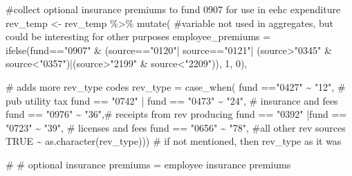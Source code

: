 \documentclass[
  letterpaper,
  DIV=11,
  numbers=noendperiod]{scrreport}
\newenvironment{Shaded}{\begin{snugshade}}{\end{snugshade}}
\newcommand{\AttributeTok}[1]{\textcolor[rgb]{0.40,0.45,0.13}{#1}}
\newcommand{\CommentTok}[1]{\textcolor[rgb]{0.37,0.37,0.37}{#1}}
\newcommand{\ConstantTok}[1]{\textcolor[rgb]{0.56,0.35,0.01}{#1}}
\newcommand{\DecValTok}[1]{\textcolor[rgb]{0.68,0.00,0.00}{#1}}
\newcommand{\FunctionTok}[1]{\textcolor[rgb]{0.28,0.35,0.67}{#1}}
\newcommand{\NormalTok}[1]{\textcolor[rgb]{0.00,0.23,0.31}{#1}}
\newcommand{\OtherTok}[1]{\textcolor[rgb]{0.00,0.23,0.31}{#1}}
\newcommand{\SpecialCharTok}[1]{\textcolor[rgb]{0.37,0.37,0.37}{#1}}
\newcommand{\StringTok}[1]{\textcolor[rgb]{0.13,0.47,0.30}{#1}}
\begin{document}
\begin{Shaded}
\begin{Highlighting}[]
\CommentTok{\#collect optional insurance premiums to fund 0907 for use in eehc expenditure  }
\NormalTok{rev\_temp }\OtherTok{\textless{}{-}}\NormalTok{ rev\_temp }\SpecialCharTok{\%\textgreater{}\%} 
  \FunctionTok{mutate}\NormalTok{(}
    \CommentTok{\#variable not used in aggregates, but could be interesting for other purposes}
    \AttributeTok{employee\_premiums =} \FunctionTok{ifelse}\NormalTok{(fund}\SpecialCharTok{==}\StringTok{"0907"} \SpecialCharTok{\&}\NormalTok{ (source}\SpecialCharTok{==}\StringTok{"0120"}\SpecialCharTok{|}\NormalTok{ source}\SpecialCharTok{==}\StringTok{"0121"}\SpecialCharTok{|}\NormalTok{ (source}\SpecialCharTok{\textgreater{}}\StringTok{"0345"} \SpecialCharTok{\&}\NormalTok{ source}\SpecialCharTok{\textless{}}\StringTok{"0357"}\NormalTok{)}\SpecialCharTok{|}\NormalTok{(source}\SpecialCharTok{\textgreater{}}\StringTok{"2199"} \SpecialCharTok{\&}\NormalTok{ source}\SpecialCharTok{\textless{}}\StringTok{"2209"}\NormalTok{)), }\DecValTok{1}\NormalTok{, }\DecValTok{0}\NormalTok{),}
    
    \CommentTok{\# adds more rev\_type codes}
    \AttributeTok{rev\_type =} \FunctionTok{case\_when}\NormalTok{(}
\NormalTok{      fund }\SpecialCharTok{==}\StringTok{"0427"} \SpecialCharTok{\textasciitilde{}} \StringTok{"12"}\NormalTok{, }\CommentTok{\# pub utility tax}
\NormalTok{      fund }\SpecialCharTok{==} \StringTok{"0742"} \SpecialCharTok{|}\NormalTok{ fund }\SpecialCharTok{==} \StringTok{"0473"} \SpecialCharTok{\textasciitilde{}} \StringTok{"24"}\NormalTok{, }\CommentTok{\# insurance and fees}
\NormalTok{      fund }\SpecialCharTok{==} \StringTok{"0976"} \SpecialCharTok{\textasciitilde{}} \StringTok{"36"}\NormalTok{,}\CommentTok{\# receipts from rev producing}
\NormalTok{      fund }\SpecialCharTok{==} \StringTok{"0392"} \SpecialCharTok{|}\NormalTok{fund }\SpecialCharTok{==} \StringTok{"0723"} \SpecialCharTok{\textasciitilde{}} \StringTok{"39"}\NormalTok{, }\CommentTok{\# licenses and fees}
\NormalTok{      fund }\SpecialCharTok{==} \StringTok{"0656"} \SpecialCharTok{\textasciitilde{}} \StringTok{"78"}\NormalTok{, }\CommentTok{\#all other rev sources}
      \ConstantTok{TRUE} \SpecialCharTok{\textasciitilde{}} \FunctionTok{as.character}\NormalTok{(rev\_type)))}
\CommentTok{\# if not mentioned, then rev\_type as it was}



\CommentTok{\# \# optional insurance premiums = employee insurance premiums}


\end{Highlighting}
\end{Shaded}
\end{document}

